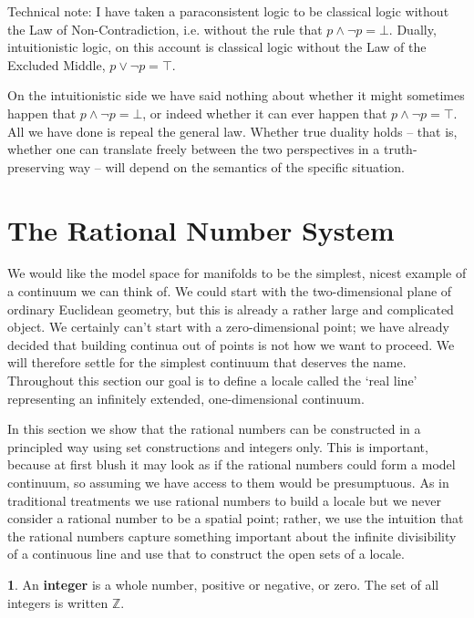 \documentclass[oneside,english]{amsbook}
\numberwithin{section}{chapter}
\theoremstyle{plain}
\theoremstyle{definition}
\newtheorem{defn}[thm]{\protect\definitionname}
\providecommand{\definitionname}{Definition}
\begin{document}
Technical note: I have taken a paraconsistent logic to be classical logic without the Law of Non-Contradiction, i.e. without the rule that $p\land\lnot p = \bot$. Dually, intuitionistic logic, on this account is classical logic without the Law of the Excluded Middle, $p\lor\lnot p = \top$. 

On the intuitionistic side we have said nothing about whether it might sometimes happen that $p\land\lnot p = \bot$, or indeed whether it can ever happen that $p\land\lnot p = \top$. All we have done is repeal the general law. Whether true duality holds -- that is, whether one can translate freely between the two perspectives in a truth-preserving way -- will depend on the semantics of the specific situation.

\section{The Rational Number System}

We would like the model space for manifolds to be the simplest, nicest example of a continuum we can think of. We could start with the two-dimensional plane of ordinary Euclidean geometry, but this is already a rather large and complicated object. We certainly can't start with a zero-dimensional point; we have already decided that building continua out of points is not how we want to proceed. We will therefore settle for the simplest continuum that deserves the name. Throughout this section our goal is to define a locale called the `real line' representing an infinitely extended, one-dimensional continuum. 

In this section we show that the rational numbers can be constructed in a principled way using set constructions and integers only. This is important, because at first blush it may look as if the rational numbers could form a model continuum, so assuming we have access to them would be presumptuous. As in traditional treatments we use rational numbers to build a locale but we never consider a rational number to be a spatial point; rather, we use the intuition that the rational numbers capture something important about the infinite divisibility of a continuous line and use that to construct the open sets of a locale.

\begin{defn}
	An \textbf{integer} is a whole number, positive or negative, or zero. The set of all integers is written $\mathbb{Z}$.
\end{defn}
\end{document}

